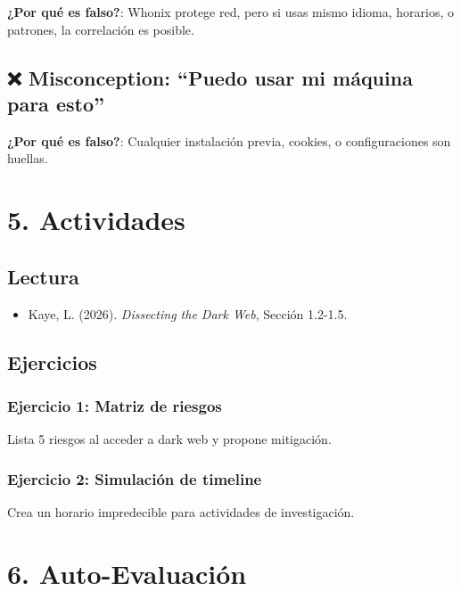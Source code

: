 \documentclass[
  letterpaper,
]{report}
\providecommand{\tightlist}{%
  \setlength{\itemsep}{0pt}\setlength{\parskip}{0pt}}
\begin{document}
\textbf{¿Por qué es falso?}: Whonix protege red, pero si usas mismo
idioma, horarios, o patrones, la correlación es posible.

\subsection{❌ Misconception: ``Puedo usar mi máquina para
esto''}\label{misconception-puedo-usar-mi-muxe1quina-para-esto}

\textbf{¿Por qué es falso?}: Cualquier instalación previa, cookies, o
configuraciones son huellas.

\section{5. Actividades}\label{actividades-1}

\subsection{Lectura}\label{lectura}

\begin{itemize}
\tightlist
\item
  Kaye, L. (2026). \emph{Dissecting the Dark Web}, Sección 1.2-1.5.
\end{itemize}

\subsection{Ejercicios}\label{ejercicios}

\subsubsection{Ejercicio 1: Matriz de
riesgos}\label{ejercicio-1-matriz-de-riesgos}

Lista 5 riesgos al acceder a dark web y propone mitigación.

\subsubsection{Ejercicio 2: Simulación de
timeline}\label{ejercicio-2-simulaciuxf3n-de-timeline}

Crea un horario impredecible para actividades de investigación.

\section{6. Auto-Evaluación}\label{auto-evaluaciuxf3n-1}
\end{document}
